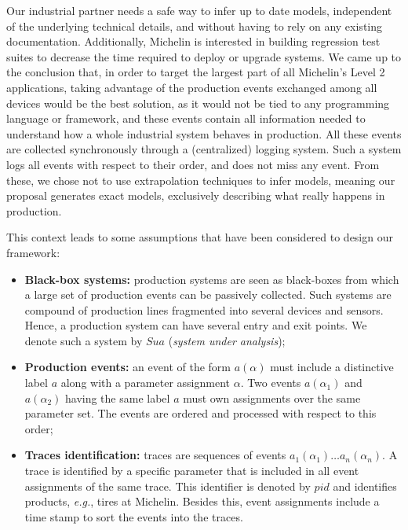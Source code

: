 Our industrial partner needs a safe way to infer up to date
models, independent of the underlying technical details, and
without having to rely on any existing documentation.
Additionally, Michelin is interested in building regression test
suites to decrease the time required to deploy or upgrade
systems. We came up to the conclusion that, in order to target
the largest part of all Michelin's Level 2 applications, taking
advantage of the production events exchanged among all devices
would be the best solution, as it would not be tied to any
programming language or framework, and these events contain all
information needed to understand how a whole industrial system
behaves in production. All these events are collected
synchronously through a (centralized) logging system. Such a
system logs all events with respect to their order, and does not
miss any event.  From these, we chose not to use extrapolation
techniques to infer models, meaning our proposal generates
exact models, exclusively describing what really happens
in production.

This context leads to some assumptions that have been considered
to design our framework:

\begin{itemize}
    \item \textbf{Black-box systems:} production systems are seen as
        black-boxes from which a large set of production events can
        be passively collected. Such systems are compound of
        production lines fragmented into several devices and sensors.
        Hence, a production system can have several entry and exit
        points. We denote such a system by $\mathit{Sua}$ (\emph{system
        under analysis});

    \item \textbf{Production events:} an event of the form
        $a(\alpha)$ must include a distinctive label $a$ along with a
        parameter assignment $\alpha$. Two events $a(\alpha_1)$ and
        $a(\alpha_2)$ having the same label $a$ must own assignments
        over the same parameter set. The events are ordered and
        processed with respect to this order;

    \item \textbf{Traces identification:} traces are sequences of
        events $a_1(\alpha_1) \dots  a_n(\alpha_n)$. A
        trace is identified by a specific parameter that is
        included in all event assignments of the same trace. This
        identifier is denoted by $pid$ and identifies products,
        \emph{e.g.}, tires at Michelin.  Besides this, event
        assignments include a time stamp to sort the events into
        the traces.
\end{itemize}

